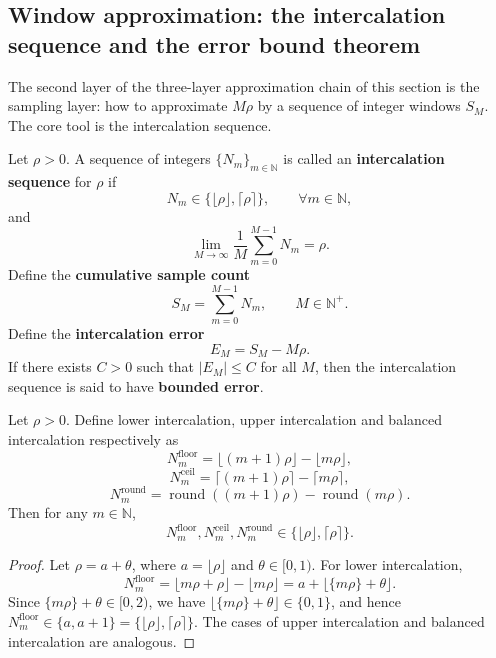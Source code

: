 \subsection{Window approximation: the intercalation sequence and the error bound theorem}

The second layer of the three-layer approximation chain of this section is the sampling layer: how to approximate $M\rho$ by a sequence of integer windows $S_M$. The core tool is the intercalation sequence.

\begin{definition}\label{def:intercalation_sequence_harmonic}
Let \(\rho>0\). A sequence of integers \(\{N_m\}_{m\in\mathbb{N}}\) is called an \textbf{intercalation sequence} for \(\rho\) if
\[
N_m\in\{\lfloor\rho\rfloor,\lceil\rho\rceil\},\qquad \forall m\in\mathbb{N},
\]
and
\[
\lim_{M\to\infty}\frac{1}{M}\sum_{m=0}^{M-1}N_m=\rho.
\]
Define the \textbf{cumulative sample count}
\[
S_M=\sum_{m=0}^{M-1}N_m,\qquad M\in\mathbb{N}^+.
\]
Define the \textbf{intercalation error}
\[
E_M=S_M-M\rho.
\]
If there exists \(C>0\) such that \(|E_M|\le C\) for all \(M\), then the intercalation sequence is said to have \textbf{bounded error}.
\end{definition}

\begin{lemma}\label{lem:intercalation_values_harmonic}
Let \(\rho>0\). Define lower intercalation, upper intercalation and balanced intercalation respectively as
\[
N_m^{\mathrm{floor}}=\lfloor (m+1)\rho\rfloor-\lfloor m\rho\rfloor,
\]
\[
N_m^{\mathrm{ceil}}=\lceil (m+1)\rho\rceil-\lceil m\rho\rceil,
\]
\[
N_m^{\mathrm{round}}=\operatorname{round}((m+1)\rho)-\operatorname{round}(m\rho).
\]
Then for any \(m\in\mathbb{N}\),
\[
N_m^{\mathrm{floor}},N_m^{\mathrm{ceil}},N_m^{\mathrm{round}}\in\{\lfloor\rho\rfloor,\lceil\rho\rceil\}.
\]
\end{lemma}

\begin{proof}
Let \(\rho=a+\theta\), where \(a=\lfloor\rho\rfloor\) and \(\theta\in[0,1)\). For lower intercalation,
\[
N_m^{\mathrm{floor}}=\lfloor m\rho+\rho\rfloor-\lfloor m\rho\rfloor
=a+\lfloor\{m\rho\}+\theta\rfloor.
\]
Since \(\{m\rho\}+\theta\in[0,2)\), we have \(\lfloor\{m\rho\}+\theta\rfloor\in\{0,1\}\), and hence \(N_m^{\mathrm{floor}}\in\{a,a+1\}=\{\lfloor\rho\rfloor,\lceil\rho\rceil\}\). The cases of upper intercalation and balanced intercalation are analogous.
\end{proof}

